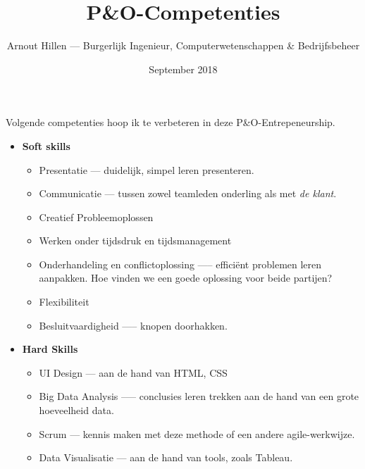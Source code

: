 \documentclass{article}
\title{P\&O-Competenties}
\author{Arnout Hillen --- 
        Burgerlijk Ingenieur, Computerwetenschappen \& Bedrijfsbeheer}
\date{September 2018}
\begin{document}
\maketitle

Volgende competenties hoop ik te verbeteren in deze P\&O-Entrepeneurship.

\begin{itemize}
    \item \textbf{Soft skills}
    \begin{itemize}    
        \item Presentatie --- duidelijk, simpel leren presenteren.
        \item Communicatie --- tussen zowel teamleden onderling als met \textit{de klant}.
        \item Creatief Probleemoplossen
        \item Werken onder tijdsdruk en tijdsmanagement
        \item Onderhandeling en conflictoplossing —-- efficiënt problemen leren aanpakken. Hoe vinden we een goede oplossing voor beide partijen?
        \item Flexibiliteit
        \item Besluitvaardigheid —-- knopen doorhakken.
    \end{itemize}
    
    \item \textbf{Hard Skills}
    \begin{itemize}
        \item UI Design --- aan de hand van HTML, CSS
        \item Big Data Analysis --— conclusies leren trekken aan de hand van een grote hoeveelheid data.
        \item Scrum --- kennis maken met deze methode of een andere agile-werkwijze.
        \item Data Visualisatie --- aan de hand van tools, zoals Tableau.
    \end{itemize}    
\end{itemize}
\end{document}
